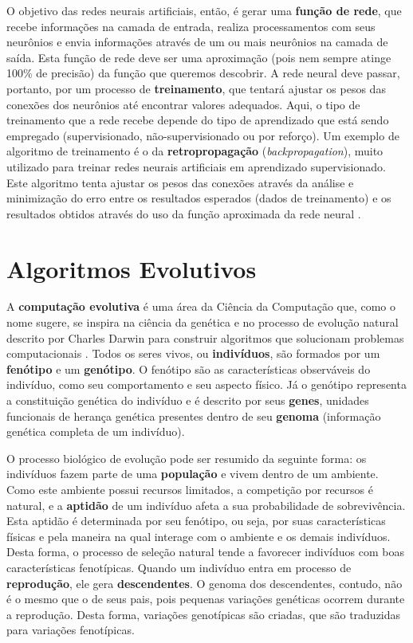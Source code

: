 O objetivo das redes neurais artificiais, então, é gerar uma \textbf{função de
rede}, que recebe informações na camada de entrada, realiza processamentos com
seus neurônios e envia informações através de um ou mais neurônios na camada de
saída. Esta função de rede deve ser uma aproximação (pois nem sempre atinge
100\% de precisão) da função que queremos descobrir. A rede neural deve passar,
portanto, por um processo de \textbf{treinamento}, que tentará ajustar os pesos
das conexões dos neurônios até encontrar valores adequados. Aqui, o tipo de
treinamento que a rede recebe depende do tipo de aprendizado que está sendo
empregado (supervisionado, não-supervisionado ou por reforço). Um exemplo de
algoritmo de treinamento é o da \textbf{retropropagação}
(\textit{backpropagation}), muito utilizado para treinar redes neurais
artificiais em aprendizado supervisionado. Este algoritmo tenta ajustar os pesos
das conexões através da análise e minimização do erro entre os resultados
esperados (dados de treinamento) e os resultados obtidos através do uso da
função aproximada da rede neural \cite[Cap. 7]{Rojas:1996:NNS:235222}.


\section{\label{section:evolutionary-algorithms}Algoritmos Evolutivos}
A \textbf{computação evolutiva} é uma área da Ciência da Computação que, como o
nome sugere, se inspira na ciência da genética e no processo de evolução
natural descrito por Charles Darwin para construir algoritmos que solucionam
problemas computacionais \cite[Cap. 2]{IntroEvolComputing}. Todos os seres
vivos, ou \textbf{indivíduos}, são formados por um \textbf{fenótipo} e um
\textbf{genótipo}. O fenótipo são as características observáveis do indivíduo,
como seu comportamento e seu aspecto físico. Já o genótipo representa a
constituição genética do indivíduo e é descrito por seus \textbf{genes},
unidades funcionais de herança genética presentes dentro de seu \textbf{genoma}
(informação genética completa de um indivíduo). 

O processo biológico de evolução pode ser resumido da seguinte forma: os
indivíduos fazem parte de uma \textbf{população} e vivem dentro de um ambiente.
Como este ambiente possui recursos limitados, a competição por recursos é
natural, e a \textbf{aptidão} de um indivíduo afeta a sua probabilidade de
sobrevivência. Esta aptidão é determinada por seu fenótipo, ou seja, por suas
características físicas e pela maneira na qual interage com o ambiente e os
demais indivíduos. Desta forma, o processo de seleção natural tende a favorecer
indivíduos com boas características fenotípicas.  Quando um indivíduo entra em
processo de \textbf{reprodução}, ele gera \textbf{descendentes}. O genoma dos
descendentes, contudo, não é o mesmo que o de seus pais, pois pequenas variações
genéticas ocorrem durante a reprodução. Desta forma, variações genotípicas são
criadas, que são traduzidas para variações fenotípicas. 

